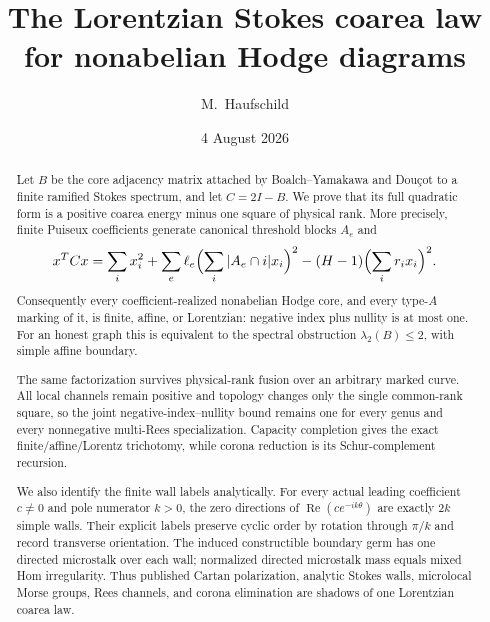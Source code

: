 \documentclass[11pt,a4paper]{amsart}
\theoremstyle{plain}
\theoremstyle{definition}
\begin{document}
\title[The Lorentzian Stokes coarea law]{The Lorentzian Stokes coarea law for nonabelian Hodge diagrams}
\author{M.~Haufschild}
\address{Independent researcher}
\date{4 August 2026}

\begin{abstract}
Let $B$ be the core adjacency matrix attached by Boalch--Yamakawa and Dou\c{c}ot to a finite
ramified Stokes spectrum, and let $C=2I-B$.  We prove that its full quadratic form is a positive
coarea energy minus one square of physical rank.  More precisely, finite Puiseux coefficients
generate canonical threshold blocks $A_e$ and
\[
 x^TCx=\sum_i x_i^2+\sum_e\ell_e\Bigl(\sum_i|A_e\cap i|x_i\Bigr)^2
              -(H-1)\Bigl(\sum_i r_ix_i\Bigr)^2.
\]
Consequently every coefficient-realized nonabelian Hodge core, and every type-$A$ marking of it,
is finite, affine, or Lorentzian: negative index plus nullity is at most one.  For an honest graph
this is equivalent to the spectral obstruction $\lambda_2(B)\leq2$, with simple affine boundary.

The same factorization survives physical-rank fusion over an arbitrary marked curve.  All local
channels remain positive and topology changes only the single common-rank square, so the joint
negative-index--nullity bound remains one for every genus and every nonnegative multi-Rees
specialization.  Capacity completion gives the exact finite/affine/Lorentz trichotomy, while
corona reduction is its Schur-complement recursion.

We also identify the finite wall labels analytically.  For every actual leading coefficient
$c\ne0$ and pole numerator $k>0$, the zero directions of
$\operatorname{Re}(ce^{-ik\theta})$ are exactly $2k$ simple walls.  Their explicit labels preserve
cyclic order by rotation through $\pi/k$ and record transverse orientation.  The induced
constructible boundary germ has one directed microstalk over each wall; normalized directed
microstalk mass equals mixed Hom irregularity.  Thus published Cartan polarization, analytic
Stokes walls, microlocal Morse groups, Rees channels, and corona elimination are shadows of one
Lorentzian coarea law.
\end{abstract}
\maketitle
\end{document}

